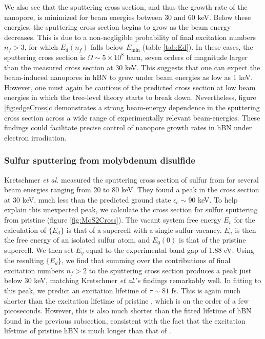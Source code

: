 \documentclass[twoside,twocolumn,9pt]{article}
\begin{document}
We also see that the sputtering cross section, and thus the growth rate of the
nanopore, is minimized for beam energies between 30 and 60 keV.
Below these energies, the sputtering cross section begins to grow as the beam
energy decreases.
This is due to a non-negligible probability of final excitation numbers $n_f >
3$, for which $E_d(n_f)$ falls below $E_\text{min}$ (table \ref{tab:Ed}).
In these cases, the sputtering cross section is $\Omega \sim 5\times10^8$ barn,
seven orders of magnitude larger than the measured cross section at 30 keV.
This suggests that one can expect the beam-induced nanopores in hBN to grow under
beam energies as low as 1 keV.
However, one must again be cautious of the predicted cross section at low beam
energies in which the tree-level theory starts to break down.
Nevertheless, figure \ref{fig:edgeCross}c demonstrates a strong beam-energy
dependence in the sputtering cross section across a wide range of
experimentally relevant beam-energies.
These findings could facilitate precise control of nanopore growth rates in hBN
under electron irradiation.

\subsubsection{Sulfur sputtering from molybdenum disulfide}
\label{sec:MoS2}

Kretschmer \textit{et al.} measured the sputtering cross section of sulfur from 
for several beam energies ranging from 20 to 80 keV.\cite{Kretschmer2020}
They found a peak in the cross section at 30 keV, much less than the predicted
ground state $\epsilon_c\sim 90$ keV.\cite{Kretschmer2020}
To help explain this unexpected peak, we calculate the cross section for sulfur
sputtering from pristine  (figure \ref{fig:MoS2Cross}).
The vacant system free energy $E_v$ for the calculation of $\{E_d\}$ is that of a
 supercell with a single sulfur vacancy.
$E_a$ is then the free energy of an isolated sulfur atom, and $E_0(0)$ is that
of the pristine  supercell.
We then set $E_g$ equal to the experimental band gap of 1.88 eV.
\cite{Gusakova2017}
Using the resulting $\{E_d\}$, we find that summing over the contributions
of final excitation numbers $n_f > 2$ to the sputtering cross section produces
a peak just below 30 keV, matching Kretschmer \textit{et al.}'s findings remarkably
well.
In fitting to this peak, we predict an excitation lifetime of $\tau \sim 81$
fs.
This is again much shorter than the excitation lifetime of pristine ,
which is on the order of a few picoseconds.\cite{Korn2011, Lagarde2014,
Palummo2015a}
However, this is also much shorter than the fitted lifetime of hBN found in the
previous subsection, consistent with the fact that the excitation lifetime of
pristine hBN is much longer than that of .
\end{document}
